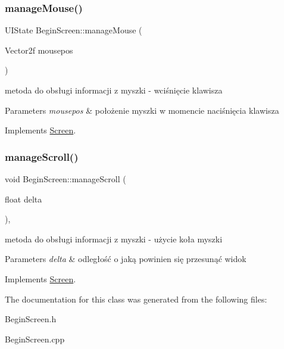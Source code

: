 \mbox{\label{class_begin_screen_a49b4b67234a8f16d7aa6ba0f0ec982a2}} 
\subsubsection{\texorpdfstring{manageMouse()}{manageMouse()}}
{\footnotesize\ttfamily U\+I\+State Begin\+Screen\+::manage\+Mouse (\begin{DoxyParamCaption}\item[{Vector2f}]{mousepos }\end{DoxyParamCaption})\hspace{0.3cm}{\ttfamily [virtual]}}



metoda do obsługi informacji z myszki -\/ wciśnięcie klawisza 


\begin{DoxyParams}{Parameters}
{\em mousepos} & położenie myszki w momencie naciśnięcia klawisza \\
\hline
\end{DoxyParams}


Implements \mbox{\hyperlink{class_screen_aee89e0a473a855ddd0ae9cd38c5f2529}{Screen}}.

\mbox{\label{class_begin_screen_aa105e5520474e8d9eb1f108cf736967b}} 
\subsubsection{\texorpdfstring{manageScroll()}{manageScroll()}}
{\footnotesize\ttfamily void Begin\+Screen\+::manage\+Scroll (\begin{DoxyParamCaption}\item[{float}]{delta }\end{DoxyParamCaption})\hspace{0.3cm}{\ttfamily [inline]}, {\ttfamily [virtual]}}



metoda do obsługi informacji z myszki -\/ użycie koła myszki 


\begin{DoxyParams}{Parameters}
{\em delta} & odległość o jaką powinien się przesunąć widok \\
\hline
\end{DoxyParams}


Implements \mbox{\hyperlink{class_screen_a039b9d63b0afafff7af22c26e2d81f5e}{Screen}}.



The documentation for this class was generated from the following files\+:\begin{DoxyCompactItemize}
\item 
Begin\+Screen.\+h\item 
Begin\+Screen.\+cpp\end{DoxyCompactItemize}
